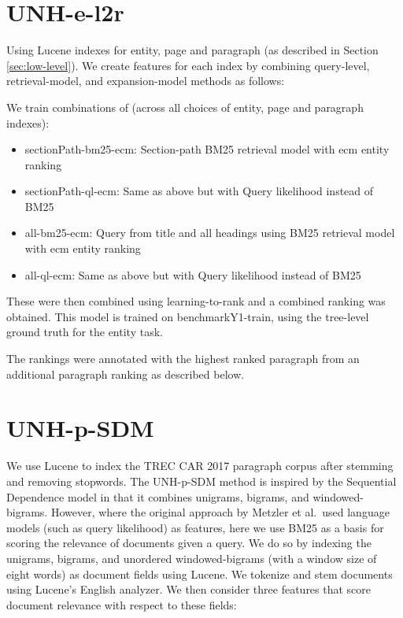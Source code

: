 \documentclass{article}
\begin{document}
\section{UNH-e-l2r}

Using Lucene indexes for %
entity, page and paragraph (as described in Section \ref{sec:low-level}). We create features for each index by combining query-level, retrieval-model, and expansion-model methods as follows:

We train combinations of (across all choices of entity, page and paragraph indexes):
\begin{itemize}
    \item sectionPath-bm25-ecm: Section-path BM25 retrieval model with ecm entity ranking
    \item sectionPath-ql-ecm: Same as above but with Query likelihood instead of BM25
    \item all-bm25-ecm: Query from title and all headings using BM25 retrieval model with ecm entity ranking
    \item all-ql-ecm: Same as above but with Query likelihood instead of BM25
\end{itemize}



These were then combined using  learning-to-rank and a combined ranking was obtained. 
This model is trained on benchmarkY1-train, using the tree-level ground truth for the entity task.

The rankings were annotated with the highest ranked paragraph from an additional paragraph ranking as described below.


\section{UNH-p-SDM}\label{sec:sdm}

We use Lucene to index the TREC CAR 2017 paragraph corpus after stemming and removing stopwords.
The UNH-p-SDM method is inspired by the Sequential Dependence model \cite{metzler2005markov} in that it combines unigrams, bigrams, and windowed-bigrams. However, where the original approach by Metzler et al.\ used language models (such as query likelihood) as features, here we use BM25 as a basis for scoring the relevance of documents given a query. We do so by indexing the unigrams, bigrams, and unordered windowed-bigrams (with a window size of eight words) as document fields using Lucene. We tokenize and stem documents using Lucene's English analyzer. We then consider three features that score document relevance with respect to these fields:
 
\end{document}
